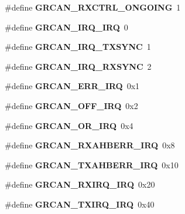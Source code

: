 \begin{DoxyCompactItemize}
\mbox{\label{group__can_gac08bdb59d193b559b1578132161f9546}} 
\#define {\bfseries G\+R\+C\+A\+N\+\_\+\+R\+X\+C\+T\+R\+L\+\_\+\+O\+N\+G\+O\+I\+NG}~1
\item 
\mbox{\label{group__can_ga0c3e057ba7641651810ecd9b70cc7917}} 
\#define {\bfseries G\+R\+C\+A\+N\+\_\+\+I\+R\+Q\+\_\+\+I\+RQ}~0
\item 
\mbox{\label{group__can_gaf7861453c6124cb13a2340e03ba8a55d}} 
\#define {\bfseries G\+R\+C\+A\+N\+\_\+\+I\+R\+Q\+\_\+\+T\+X\+S\+Y\+NC}~1
\item 
\mbox{\label{group__can_gac84582dc5d6eda62b932a2824b3ccb89}} 
\#define {\bfseries G\+R\+C\+A\+N\+\_\+\+I\+R\+Q\+\_\+\+R\+X\+S\+Y\+NC}~2
\item 
\mbox{\label{group__can_gaac06d12308b4ad3f587a6279f9064741}} 
\#define {\bfseries G\+R\+C\+A\+N\+\_\+\+E\+R\+R\+\_\+\+I\+RQ}~0x1
\item 
\mbox{\label{group__can_ga8116237e42fefcdc788a906a22b8fe41}} 
\#define {\bfseries G\+R\+C\+A\+N\+\_\+\+O\+F\+F\+\_\+\+I\+RQ}~0x2
\item 
\mbox{\label{group__can_gacad50ba86dbd6c9ede54dbafd488129e}} 
\#define {\bfseries G\+R\+C\+A\+N\+\_\+\+O\+R\+\_\+\+I\+RQ}~0x4
\item 
\mbox{\label{group__can_ga73f092262b27b547bebaa6ac5ea82b17}} 
\#define {\bfseries G\+R\+C\+A\+N\+\_\+\+R\+X\+A\+H\+B\+E\+R\+R\+\_\+\+I\+RQ}~0x8
\item 
\mbox{\label{group__can_ga903c26fd8e4a9869d24c4fc4e5b354d6}} 
\#define {\bfseries G\+R\+C\+A\+N\+\_\+\+T\+X\+A\+H\+B\+E\+R\+R\+\_\+\+I\+RQ}~0x10
\item 
\mbox{\label{group__can_ga957e85f16d583cb01791837d4de1d5a8}} 
\#define {\bfseries G\+R\+C\+A\+N\+\_\+\+R\+X\+I\+R\+Q\+\_\+\+I\+RQ}~0x20
\item 
\mbox{\label{group__can_gace3164bc1c3df446cf320dfc48a4340d}} 
\#define {\bfseries G\+R\+C\+A\+N\+\_\+\+T\+X\+I\+R\+Q\+\_\+\+I\+RQ}~0x40

\end{DoxyCompactItemize}
